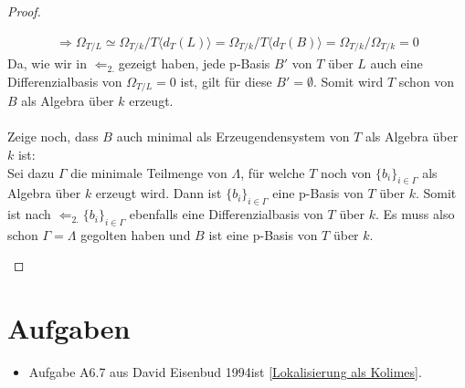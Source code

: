 \documentclass[10pt,a4paper]{report}
\newcommand{\comment}[1]{}
\newcommand{\ModulsOfDifferenzials}{David Eisenbud 1994}
\newcommand{\divR}[2]{\Omega_{#1/#2}}
\newcommand{\divf}[1]{d_{#1}}
\newcommand{\Verz}[1]{\langle #1 \rangle}
\begin{document}
\begin{proof}
\begin{itemize}
\begin{gather*}
\Rightarrow \divR{T}{L} \simeq \divR{T}{k}/T\Verz{\divf{T}(L)} = \divR{T}{k}/T\Verz{\divf{T}(B)}=
\divR{T}{k}/\divR{T}{k} = 0
\end{gather*}
Da, wie wir in \glqq$\Leftarrow_{2.}$\grqq gezeigt haben, jede p-Basis $B'$ von $T$ über $L$ auch eine Differenzialbasis von $\divR{T}{L} = 0$ ist, gilt für diese $B' = \emptyset$. Somit wird $T$ schon von $B$ als Algebra über $k$ erzeugt.\\
\ \\
Zeige noch, dass $B$ auch minimal als Erzeugendensystem von $T$ als Algebra über $k$ ist:\\
Sei dazu $\Gamma$ die minimale Teilmenge von $\Lambda$, für welche $T$ noch von $\lbrace b_i \rbrace_{i \in \Gamma}$ als Algebra über $k$ erzeugt wird. Dann ist $\lbrace b_i \rbrace_{i \in \Gamma}$ eine p-Basis von $T$ über $k$. Somit ist nach \glqq$\Leftarrow_{2.}$\grqq $\lbrace b_i \rbrace_{i \in \Gamma}$ ebenfalls eine Differenzialbasis von $T$ über $k$. Es muss also schon $\Gamma = \Lambda$ gegolten haben und $B$ ist eine p-Basis von $T$ über $k$. \comment{\label{*p-Basis ist minnimaler Erzeuger von T als Algebra}}
\end{itemize}
\end{proof}


\chapter{Aufgaben}
\begin{itemize}
\item Aufgabe A6.7 aus \ModulsOfDifferenzials ist \cref{Lokalisierung als Kolimes}.
\end{itemize}
\end{document}
